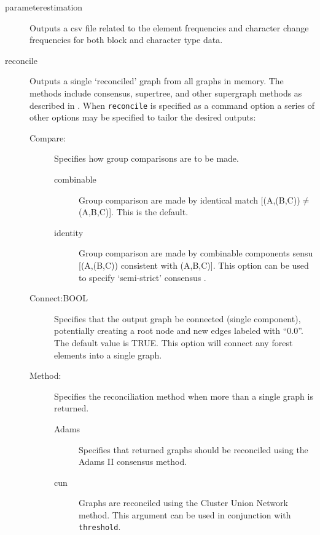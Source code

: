 \begin{description}
		\item[parameterestimation] Outputs a csv file related to the element
		frequencies and character change frequencies for both block and character
		type data.
		
		\item[reconcile] Outputs a single `reconciled' graph from all graphs in 
		memory. The methods include consensus, supertree, and other supergraph 
		methods as described in \cite{Wheeler2012, Wheeler2022}. When \texttt{reconcile} 
		is specified as a command option a series of other options may be specified 
		to tailor the desired outputs:
		
		\begin{description}
		
			\item [Compare:] Specifies how group comparisons are to be made.
						
			\begin{description}
				\item[combinable] Group comparison are made by identical match 
				[(A,(B,C))$\neq$(A,B,C)]. This is the default.	
								
				\item[identity] Group comparison are made by combinable components 
				sensu \cite{Nelson1979} [(A,(B,C)) consistent with (A,B,C)]. This option 
				can be used to specify `semi-strict' consensus \citep{Bremer1990}.
				     
			\end{description}
			
			\item [Connect:BOOL] Specifies that the output graph be connected 
			(single component), potentially creating a root node and new edges labeled 
			with ``0.0''. The default value is TRUE. This option will connect any forest elements
			into a single graph. 
			
			\item [Method:] Specifies the reconciliation method when more than a single
			   graph is returned.
			
			\begin{description}
			
				\item[Adams] Specifies that returned graphs should be reconciled using the 
				Adams II consensus \citep{Adams1972} method.
				
				\item[cun] Graphs are reconciled using the Cluster Union Network 
				\citep{Baroni2005} method. This argument can be used in conjunction with 
				\texttt{threshold}. 
				

\end{description}
\end{description}
\end{description}
